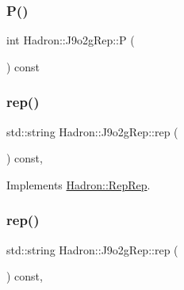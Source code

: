 \mbox{\label{structHadron_1_1J9o2gRep_a6c3ba214106f1ad5c9e0923094b620f1}} 
\subsubsection{\texorpdfstring{P()}{P()}\hspace{0.1cm}{\footnotesize\ttfamily [2/2]}}
{\footnotesize\ttfamily int Hadron\+::\+J9o2g\+Rep\+::P (\begin{DoxyParamCaption}{ }\end{DoxyParamCaption}) const\hspace{0.3cm}{\ttfamily [inline]}}

\mbox{\label{structHadron_1_1J9o2gRep_aa491d694a97b89b0ebf62632fb8b4f8b}} 
\subsubsection{\texorpdfstring{rep()}{rep()}\hspace{0.1cm}{\footnotesize\ttfamily [1/2]}}
{\footnotesize\ttfamily std\+::string Hadron\+::\+J9o2g\+Rep\+::rep (\begin{DoxyParamCaption}{ }\end{DoxyParamCaption}) const\hspace{0.3cm}{\ttfamily [inline]}, {\ttfamily [virtual]}}



Implements \mbox{\hyperlink{structHadron_1_1RepRep_ab3213025f6de249f7095892109575fde}{Hadron\+::\+Rep\+Rep}}.

\mbox{\label{structHadron_1_1J9o2gRep_aa491d694a97b89b0ebf62632fb8b4f8b}} 
\subsubsection{\texorpdfstring{rep()}{rep()}\hspace{0.1cm}{\footnotesize\ttfamily [2/2]}}
{\footnotesize\ttfamily std\+::string Hadron\+::\+J9o2g\+Rep\+::rep (\begin{DoxyParamCaption}{ }\end{DoxyParamCaption}) const\hspace{0.3cm}{\ttfamily [inline]}, {\ttfamily [virtual]}}



